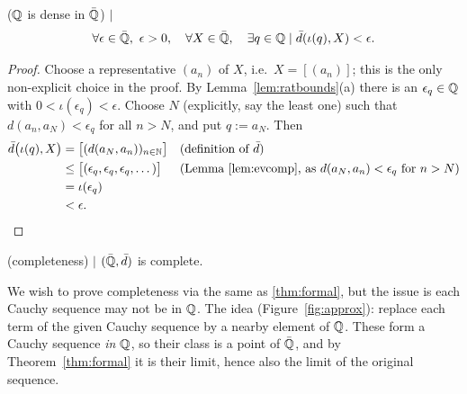 \begin{theorem} ($\mathbb{Q}$ is dense in $\bar{\mathbb{Q}}$) $\mid$ \label{thm:dense}
\[
\forall\epsilon\in\bar{\mathbb{Q}},\ \epsilon>0,\quad \forall X\in\bar{\mathbb{Q}},\quad
\exists q\in\mathbb{Q} \mid \bar{d}(\iota(q),X)<\epsilon .
\]
\end{theorem}
\begin{proof}
Choose a representative $(a_n)$ of $X$, i.e.\ $X=[(a_n)]$; this is the only
non-explicit choice in the proof. By Lemma~\ref{lem:ratbounds}(a) there is an
$\epsilon_q\in\mathbb{Q}$ with $0<\iota(\epsilon_q)<\epsilon$. Choose $N$ (explicitly,
say the least one) such that $d(a_n,a_N)<\epsilon_q$ for all $n>N$, and put
$q:=a_N$. Then
\begin{align*}
\bar{d}\big(\iota(q),X\big)
&= \big[(d(a_N,a_n))_{n\in\mathbb{N}}\big]
&&\text{(definition of $\bar{d}$)}\\
&\le \big[(\epsilon_q,\epsilon_q,\epsilon_q,\dots)\big]
&&\text{(Lemma~\ref{lem:evcomp}, as $d(a_N,a_n)<\epsilon_q$ for $n>N$)}\\
&= \iota(\epsilon_q)\\
&< \epsilon . \qedhere
\end{align*}
\end{proof}


\begin{theorem} (completeness) $\mid$ \label{thm:completev2}
$(\bar{\mathbb{Q}},\bar{d})$ is complete.
\end{theorem}

We wish to prove completeness via the same as \ref{thm:formal}, but the issue is each Cauchy sequence may not be in $\mathbb{Q}$. The idea (Figure~\ref{fig:approx}): replace each term of the given Cauchy
sequence by a nearby element of $\mathbb{Q}$. These form a Cauchy sequence \emph{in
$\mathbb{Q}$}, so their class is a point of $\bar{\mathbb{Q}}$, and by Theorem~\ref{thm:formal}
it is their limit, hence also the limit of the original sequence.

